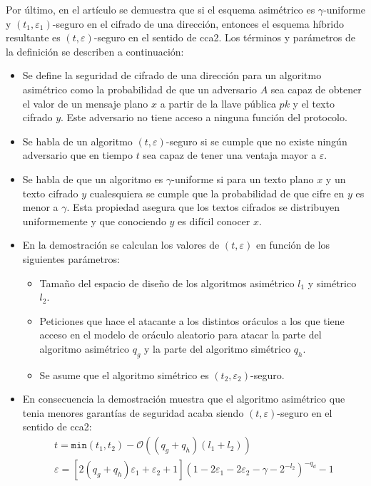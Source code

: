 Por último, en el artículo \cite{Fujisaki1999} se demuestra que si el esquema asimétrico es \(\gamma\)-uniforme y \((t_1,\varepsilon_1)\)-seguro en el cifrado de una dirección, entonces el esquema híbrido resultante es \((t,\varepsilon)\)-seguro en el sentido de \acrshort{cca2}. Los términos y parámetros de la definición se describen a continuación:
\begin{itemize}
	\item  Se define la seguridad de cifrado de una dirección para un algoritmo asimétrico como la probabilidad de que un adversario \(A\) sea capaz de obtener el valor de un mensaje plano \(x\) a partir de la llave pública \(pk\) y el texto cifrado \(y\). Este adversario no tiene acceso a ninguna función del protocolo.
	\item Se habla de un algoritmo \((t,\varepsilon)\)-seguro si se cumple que no existe ningún adversario que en tiempo \(t\) sea capaz de tener una ventaja mayor a \(\varepsilon\).
	\item Se habla de que un algoritmo es \(\gamma\)-uniforme si para un texto plano \(x\) y un texto cifrado \(y\) cualesquiera se cumple que la probabilidad de que cifre en \(y\) es menor a $\gamma$. Esta propiedad asegura que los textos cifrados se distribuyen uniformemente y que conociendo \(y\) es difícil conocer \(x\).
	\item En la demostración se calculan los valores de \((t,\varepsilon)\) en función de los siguientes parámetros:
	\begin{itemize}
		\item Tamaño del espacio de diseño de los algoritmos asimétrico \(l_1\) y simétrico \(l_2\).
		\item Peticiones que hace el atacante a los distintos oráculos a los que tiene acceso en el modelo de oráculo aleatorio para atacar la parte del algoritmo asimétrico \(q_g\) y la parte del algoritmo simétrico \(q_h\).  
		\item Se asume que el algoritmo simétrico es \((t_2,\varepsilon_2)\)-seguro.
	\end{itemize}
	\item En consecuencia la demostración muestra que el algoritmo asimétrico que tenia menores garantías de seguridad acaba siendo \((t,\varepsilon)\)-seguro en el sentido de \acrshort{cca2}:
	\begin{equation}
		\begin{array}{l}
			t=\texttt{min}(t_1,t_2)-\mathcal{O}((q_g+q_h)(l_1+l_2))\\
			\varepsilon=\left[2(q_g+q_h)\varepsilon_1+\varepsilon_2+1\right]\left(1-2\varepsilon_1-2\varepsilon_2-\gamma-2^{-l_2}\right)^{-q_d}-1
		\end{array}
	\end{equation}
\end{itemize}

